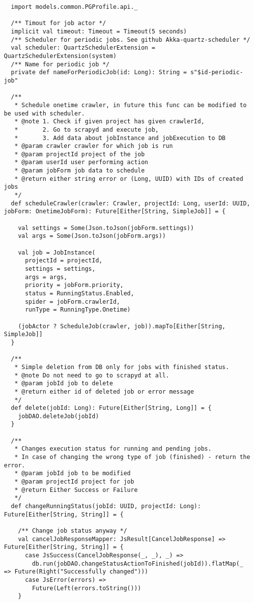 \begin{lstlisting}
  import models.common.PGProfile.api._

  /** Timout for job actor */
  implicit val timeout: Timeout = Timeout(5 seconds)
  /** Scheduler for periodic jobs. See github Akka-quartz-scheduler */
  val scheduler: QuartzSchedulerExtension = QuartzSchedulerExtension(system)
  /** Name for periodic job */
  private def nameForPeriodicJob(id: Long): String = s"$id-periodic-job"

  /**
   * Schedule onetime crawler, in future this func can be modified to be used with scheduler.
   * @note 1. Check if given project has given crawlerId,
   *       2. Go to scrapyd and execute job,
   *       3. Add data about jobInstance and jobExecution to DB
   * @param crawler crawler for which job is run
   * @param projectId project of the job
   * @param userId user performing action
   * @param jobForm job data to schedule
   * @return either string error or (Long, UUID) with IDs of created jobs
   */
  def scheduleCrawler(crawler: Crawler, projectId: Long, userId: UUID, jobForm: OnetimeJobForm): Future[Either[String, SimpleJob]] = {

    val settings = Some(Json.toJson(jobForm.settings))
    val args = Some(Json.toJson(jobForm.args))

    val job = JobInstance(
      projectId = projectId,
      settings = settings,
      args = args,
      priority = jobForm.priority,
      status = RunningStatus.Enabled,
      spider = jobForm.crawlerId,
      runType = RunningType.Onetime)

    (jobActor ? ScheduleJob(crawler, job)).mapTo[Either[String, SimpleJob]]
  }

  /**
   * Simple deletion from DB only for jobs with finished status.
   * @note Do not need to go to scrapyd at all.
   * @param jobId job to delete
   * @return either id of deleted job or error message
   */
  def delete(jobId: Long): Future[Either[String, Long]] = {
    jobDAO.deleteJob(jobId)
  }

  /**
   * Changes execution status for running and pending jobs.
   * In case of changing the wrong type of job (finished) - return the error.
   * @param jobId job to be modified
   * @param projectId project for job
   * @return Either Success or Failure
   */
  def changeRunningStatus(jobId: UUID, projectId: Long): Future[Either[String, String]] = {

    /** Change job status anyway */
    val cancelJobResponseMapper: JsResult[CancelJobResponse] => Future[Either[String, String]] = {
      case JsSuccess(CancelJobResponse(_, _), _) =>
        db.run(jobDAO.changeStatusActionToFinished(jobId)).flatMap(_ => Future(Right("Successfully changed")))
      case JsError(errors) =>
        Future(Left(errors.toString()))
    }


\end{lstlisting}
